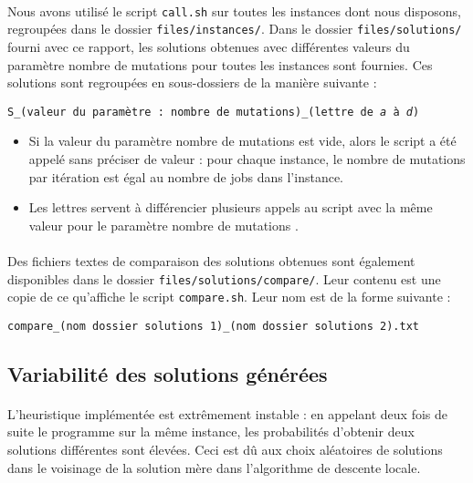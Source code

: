 \paragraph{}
Nous avons utilisé le script \texttt{call.sh} sur toutes les instances dont nous disposons, regroupées dans le dossier \texttt{files/instances/}.
Dans le dossier \texttt{files/solutions/} fourni avec ce rapport, les solutions obtenues avec différentes valeurs du paramètre \og nombre de mutations \fg{} pour toutes les instances sont fournies. Ces solutions sont regroupées en sous-dossiers de la manière suivante :
\begin{center}
\texttt{S\_(valeur du paramètre : nombre de mutations)\_(lettre de \emph{a} à \emph{d})}
\end{center}
\begin{itemize}
\item Si la valeur du paramètre \og nombre de mutations \fg{} est vide, alors le script a été appelé sans préciser de valeur :
pour chaque instance, le nombre de mutations par itération est égal au nombre de jobs dans l'instance.
\item Les lettres servent à différencier plusieurs appels au script avec la même valeur pour le paramètre \og nombre de mutations \fg{}.
\end{itemize}

\paragraph{}
Des fichiers textes de comparaison des solutions obtenues sont également disponibles dans le dossier \texttt{files/solutions/compare/}.
Leur contenu est une copie de ce qu'affiche le script \texttt{compare.sh}.
Leur nom est de la forme suivante :
\begin{center}
\texttt{compare\_(nom dossier solutions 1)\_(nom dossier solutions 2).txt}
\end{center}

\subsection{Variabilité des solutions générées}

\paragraph{}
L'heuristique implémentée est extrêmement instable : en appelant deux fois de suite le programme sur la même instance, les probabilités
d'obtenir deux solutions différentes sont élevées. Ceci est dû aux choix aléatoires de solutions dans le voisinage de la solution mère
dans l'algorithme de descente locale.

